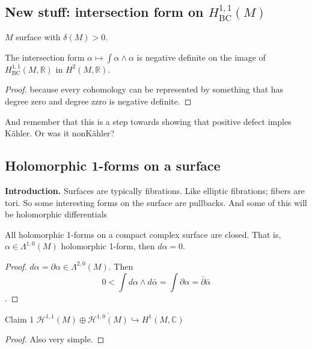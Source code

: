 \subsection{New stuff: intersection form on \(H^{1,1}_{\operatorname{BC}}(M)\)}

\begin{prop}\leavevmode
\(M\) surface with \(\delta(M)>0\).

The intersection form \(\alpha \mapsto  \int\alpha \wedge \alpha\) is negative definite on the image of \(H^{1,1}_{\operatorname{BC}}(M,\mathbb{R})\) in \(H^{2}(M,\mathbb{R})\).
\end{prop}

\begin{proof}\leavevmode
because every cohomology can be represented by something that has degree zero and degree zzro is negative definite.
\end{proof}

And remember that this is a step towards showing that positive defect imples Kähler. Or was it nonKähler?

\subsection{Holomorphic 1-forms on a surface}

\textbf{Introduction.} Surfaces are typically fibrations. Like elliptic fibrations; fibers are tori. So some interesting forms on the surface are pullbacks. And some of this will be holomorphic differentials

\begin{lemma}\leavevmode
All holomorphic 1-forms on a compact complex surface are closed. That is, \(\alpha \in \Lambda^{1,0}(M)\) holomorphic 1-form, then \(d\alpha=0\).
\end{lemma}

\begin{proof}\leavevmode
\(d \alpha= \partial  \alpha \in \Lambda^{ 2,0}(M)\). Then
\[0 < \int d \alpha \wedge d \bar{\alpha} = \int \partial  \alpha = \bar\partial \bar{ \alpha}\].
\end{proof}

\begin{thing3}{Claim 1}\leavevmode
\(\mathcal{H}^{1,1}(M) \oplus  \overline{\mathcal{H}^{1,0}(M)}\hookrightarrow H^{1}(M,\mathbb{C})\)
\end{thing3}

\begin{proof}\leavevmode
Also very simple.
\end{proof}

